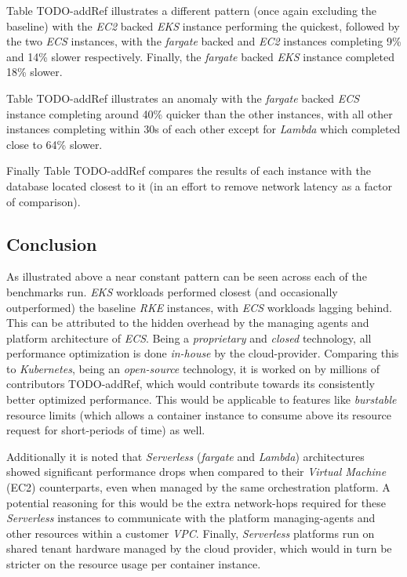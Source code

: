 Table TODO-addRef illustrates a different pattern (once again excluding the baseline) with the \textit{EC2} backed \textit{EKS} instance performing the quickest,
followed by the two \textit{ECS} instances, with the \textit{fargate} backed and \textit{EC2} instances completing 9\% and 14\% slower respectively.
Finally, the \textit{fargate} backed \textit{EKS} instance completed 18\% slower.

Table TODO-addRef illustrates an anomaly with the \textit{fargate} backed \textit{ECS} instance completing around 40\% quicker than the other instances, with all other instances completing within 30s of each other
except for \textit{Lambda} which completed close to 64\% slower.

Finally Table TODO-addRef compares the results of each instance with the database located closest to it (in an effort to remove network latency as a factor of comparison).

\subsection*{Conclusion}
As illustrated above a near constant pattern can be seen across each of the benchmarks run. \textit{EKS} workloads performed closest (and occasionally outperformed) the baseline \textit{RKE} instances,
with \textit{ECS} workloads lagging behind. This can be attributed to the hidden overhead by the managing agents and platform architecture of \textit{ECS}.
Being a \emph{proprietary} and \emph{closed} technology, all performance optimization is done \emph{in-house} by the cloud-provider.
Comparing this to \textit{Kubernetes}, being an \textit{open-source} technology, it is worked on by millions of contributors TODO-addRef, which would contribute towards its consistently better optimized
performance. This would be applicable to features like \emph{burstable} resource limits (which allows a container instance to consume above its resource request for short-periods of time) as well.

Additionally it is noted that \textit{Serverless} (\textit{fargate} and \textit{Lambda})
architectures showed significant performance drops when compared to their \textit{Virtual Machine} (EC2) counterparts,
even when managed by the same orchestration platform.
A potential reasoning for this would be the extra network-hops required for these \textit{Serverless}
instances to communicate with the platform managing-agents and other resources within a customer \textit{VPC}.
Finally, \textit{Serverless} platforms run on shared tenant hardware managed by the cloud provider,
which would in turn be stricter on the resource usage per container instance.

